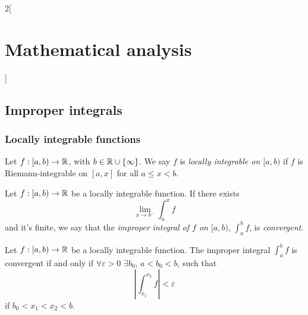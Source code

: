 \documentclass[../../../main.tex]{subfiles}
\begin{document}
\begin{multicols}{2}[\section{Mathematical analysis}]
\subsection{Improper integrals}
\subsubsection*{Locally integrable functions}
\begin{definition}
Let $f:[a,b)\rightarrow\mathbb{R} $, with $b\in\mathbb{R} \cup\{\infty\}$. We say $f$ is \textit{locally integrable on $[a,b)$} if $f$ is Riemann-integrable on $[a,x]$ for all $a\leq x<b$.
\end{definition}
\begin{definition}
Let $f:[a,b)\rightarrow\mathbb{R} $ be a locally integrable function. If there exists $$\lim_{x\to b^-}\int_a^x f$$ and it's finite, we say that the \textit{improper integral of $f$ on $[a,b)$}, $\displaystyle\int_a^b f$, is \textit{convergent}.
\end{definition}
\begin{theorem}
Let $f:[a,b)\rightarrow\mathbb{R} $ be a locally integrable function. The improper integral $\displaystyle\int_a^b f$ is convergent if and only if $\forall\varepsilon>0$ $\exists b_0$, $a<b_0<b$, such that $$\left|\int_{x_1}^{x_2} f\right|<\varepsilon$$ if $b_0<x_1<x_2<b$.
\end{theorem}

\end{multicols}
\end{document}
